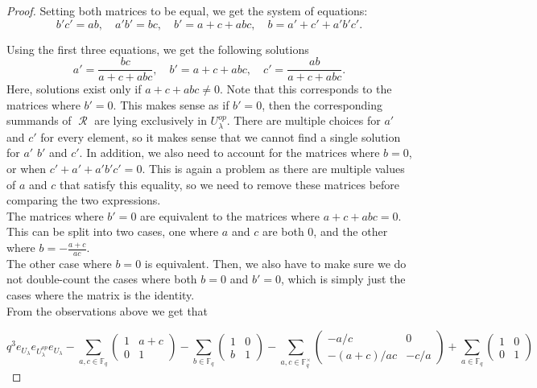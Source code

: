 \documentclass[10pt,a4paper]{amsart}
\DeclareMathOperator{\R}{\mathcal{R}}
\begin{document}
\begin{proof}
Setting both matrices to be equal, we get the system of equations:
\[
    b'c' = ab, \quad a'b' = bc, \quad b' = a+c+abc, \quad b = a'+c'+a'b'c'.
\]

Using the first three equations, we get the following solutions
\[
    a' = \frac{bc}{a+c+abc}, \quad b' = a+c+abc, \quad c' = \frac{ab}{a+c+abc}.
\]
Here, solutions exist only if $a+c+abc \ne 0$. Note that this corresponds to the matrices where $b' = 0$. This makes sense as if $b' = 0$, then the corresponding summands of $\R$ are lying exclusively in $U^{op}_\lambda$. There are multiple choices for $a'$ and $c'$ for every element, so it makes sense that we cannot find a single solution for $a'$ $b'$ and $c'$. In addition, we also need to account for the matrices where $b=0$, or when $c'+a'+a'b'c' = 0$. This is again a problem as there are multiple values of $a$ and $c$ that satisfy this equality, so we need to remove these matrices before comparing the two expressions.\\

The matrices where $b' = 0$ are equivalent to the matrices where $a+c+abc = 0$. This can be split into two cases, one where $a$ and $c$ are both $0$, and the other where $b = -\frac{a+c}{ac}$.\\

The other case where $b = 0$ is equivalent. Then, we also have to make sure we do not double-count the cases where both $b = 0$ and $b' = 0$, which is simply just the cases where the matrix is the identity.\\

From the observations above we get that

\[q^3 e_{U_{\lambda}}e_{U_{\lambda}^{op}}e_{U_{\lambda}} - \sum_{a, c \in \mathbb{F}_q} 
\begin{pmatrix}
1 & a+c \\
0 & 1 
\end{pmatrix} - \sum_{b \in \mathbb{F}_q}
\begin{pmatrix}
1 & 0 \\
b & 1 
\end{pmatrix}
- \sum_{a, c \in \mathbb{F}_q^{\times}}
\begin{pmatrix}
-a/c & 0 \\
-(a+c)/ac & -c/a 
\end{pmatrix}
+\sum_{a \in \mathbb{F}_q}
\begin{pmatrix}
1 & 0 \\
0 & 1 
\end{pmatrix}\]


\end{proof}
\end{document}
